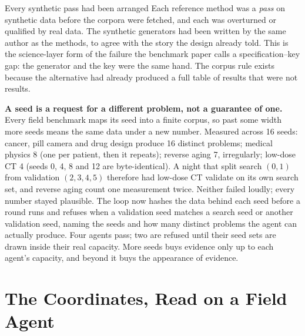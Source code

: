 \begin{cautionbox}{Every synthetic pass had been arranged}
Each reference method was a \emph{pass} on synthetic data before the corpora were fetched, and each was overturned or qualified by real data. The synthetic generators had been written by the same author as the methods, to agree with the story the design already told. This is the science-layer form of the failure the benchmark paper calls a specification--key gap: the generator and the key were the same hand. The corpus rule exists because the alternative had already produced a full table of results that were not results.
\end{cautionbox}

\textbf{A seed is a request for a different problem, not a guarantee of one.} Every field benchmark maps its seed into a finite corpus, so past some width more seeds means the same data under a new number. Measured across 16 seeds: cancer, pill camera and drug design produce 16 distinct problems; medical physics 8 (one per patient, then it repeats); reverse aging 7, irregularly; low-dose CT 4 (seeds 0, 4, 8 and 12 are byte-identical). A night that split search $(0,1)$ from validation $(2,3,4,5)$ therefore had low-dose CT validate on its own search set, and reverse aging count one measurement twice. Neither failed loudly; every number stayed plausible. The loop now hashes the data behind each seed before a round runs and refuses when a validation seed matches a search seed or another validation seed, naming the seeds and how many distinct problems the agent can actually produce. Four agents pass; two are refused until their seed sets are drawn inside their real capacity. More seeds buys evidence only up to each agent's capacity, and beyond it buys the appearance of evidence.

\section{The Coordinates, Read on a Field Agent}\label{sec:coords}


